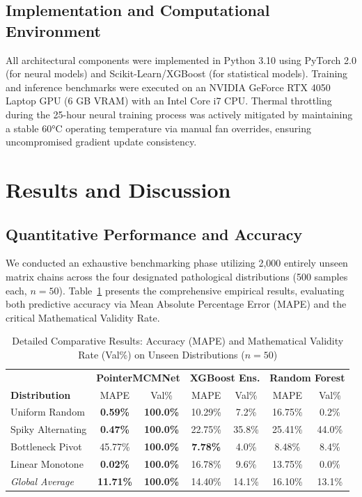 \documentclass[conference]{IEEEtran}
\begin{document}
\subsection{Implementation and Computational Environment}
All architectural components were implemented in Python 3.10 using PyTorch 2.0 (for neural models) and Scikit-Learn/XGBoost (for statistical models). Training and inference benchmarks were executed on an NVIDIA GeForce RTX 4050 Laptop GPU (6 GB VRAM) with an Intel Core i7 CPU. Thermal throttling during the 25-hour neural training process was actively mitigated by maintaining a stable 60°C operating temperature via manual fan overrides, ensuring uncompromised gradient update consistency.

\section{Results and Discussion}

\subsection{Quantitative Performance and Accuracy}
We conducted an exhaustive benchmarking phase utilizing 2,000 entirely unseen matrix chains across the four designated pathological distributions (500 samples each, $n=50$). Table~\ref{tab:main} presents the comprehensive empirical results, evaluating both predictive accuracy via Mean Absolute Percentage Error (MAPE) and the critical Mathematical Validity Rate.

\begin{table}[htbp]
\caption{Detailed Comparative Results: Accuracy (MAPE) and Mathematical Validity Rate (Val\%) on Unseen Distributions ($n{=}50$)}
\begin{center}
\footnotesize
\setlength{\tabcolsep}{3pt}
\renewcommand{\arraystretch}{1.2}
\begin{tabular}{l|cc|cc|cc}
\toprule
& \multicolumn{2}{c|}{\textbf{PointerMCMNet}} & \multicolumn{2}{c|}{\textbf{XGBoost Ens.}} & \multicolumn{2}{c}{\textbf{Random Forest}} \\
\textbf{Distribution} & MAPE & Val\% & MAPE & Val\% & MAPE & Val\% \\
\midrule
Uniform Random    & \textbf{0.59\%} & \textbf{100.0\%} & 10.29\% & 7.2\%  & 16.75\% & 0.2\%  \\
Spiky Alternating & \textbf{0.47\%} & \textbf{100.0\%} & 22.75\% & 35.8\% & 25.41\% & 44.0\% \\
Bottleneck Pivot  & 45.77\%         & \textbf{100.0\%} & \textbf{7.78\%} & 4.0\%  & 8.48\%  & 8.4\%  \\
Linear Monotone   & \textbf{0.02\%} & \textbf{100.0\%} & 16.78\% & 9.6\%  & 13.75\% & 0.0\%  \\
\midrule
\textit{Global Average} & \textbf{11.71\%} & \textbf{100.0\%} & 14.40\% & 14.1\% & 16.10\% & 13.1\% \\
\bottomrule
\end{tabular}
\label{tab:main}
\end{center}
\end{table}
\end{document}
